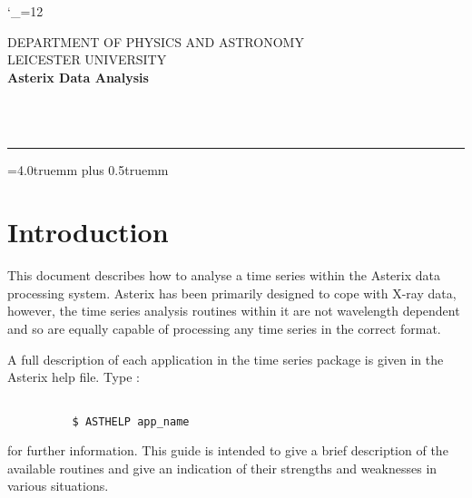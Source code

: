 \newcommand {\mandescriptionitem}[1]{\item [#1]}

\newcommand {\mantt}{\tt}

\newcommand {\manheadstyle}{}

\catcode`\_=12


\thispagestyle{empty}
DEPARTMENT OF PHYSICS AND ASTRONOMY \hfill \stardocname\\
LEICESTER UNIVERSITY\\
{\large\bf Asterix Data Analysis\\}
{\large\bf \stardoccategory\ \stardocnumber}
\begin{flushright}
\stardocauthors\\
\stardocdate
\end{flushright}
\vspace{-4mm}
\rule{\textwidth}{0.5mm}
\vspace{5mm}
\begin{center}
{\Large\bf \stardoctitle}
\end{center}
\vspace{5mm}

\parskip=4.0truemm plus 0.5truemm       %
\markright{\stardocname}

\tableofcontents

\newpage

\section{Introduction}

This document describes how to analyse a time series
within the Asterix data processing system. Asterix has been primarily
designed to cope with X-ray data, however, the time series analysis
routines within it are not wavelength dependent and so are equally 
capable of processing any time series in the correct format.

A full description of each application in the time series package is
given in the Asterix help file. Type :

\begin{verbatim}

          $ ASTHELP app_name

\end{verbatim}

for further information. This guide is intended to give a brief
description of the available routines and give an indication of
their strengths and weaknesses in various situations.

